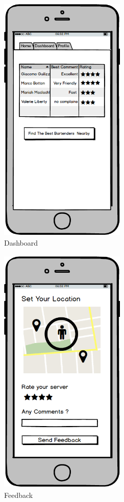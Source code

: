 \documentclass{scrreprt}
\begin{document}
\begin{figure}[!htb]
    \includegraphics[width=6cm, height=12cm]{mockups/Dashboard}
    \centering
    \caption{Dashboard}
\end{figure}

\begin{figure}[!htb]
    \includegraphics[width=6cm, height=12cm]{mockups/Feedback}
    \centering
    \caption{Feedback}
\end{figure}
\end{document}
